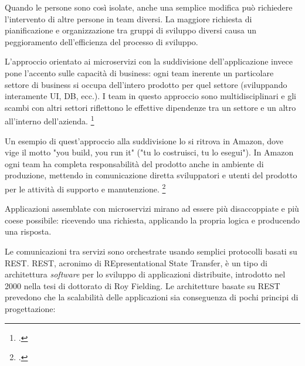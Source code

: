 Quando le persone sono così isolate, anche una semplice modifica può richiedere l'intervento di altre persone in team diversi.
La maggiore richiesta di pianificazione e organizzazione tra gruppi di sviluppo diversi causa un peggioramento dell'efficienza del processo di sviluppo.

L'approccio orientato ai microservizi con la suddivisione dell'applicazione invece pone l'accento sulle capacità di business: ogni team inerente un particolare settore di business si occupa dell'intero prodotto per quel settore (sviluppando interamente UI, DB, ecc.).
I team in questo approccio sono multidisciplinari e gli scambi con altri settori riflettono le effettive dipendenze tra un settore e un altro all'interno dell'azienda.
\footcite{site:fowler-microservices}

Un esempio di quest'approccio alla suddivisione lo si ritrova in Amazon, dove vige il motto "you build, you run it" ("tu lo costruisci, tu lo esegui").
In Amazon ogni team ha completa responsabilità del prodotto anche in ambiente di produzione, mettendo in comunicazione diretta sviluppatori e utenti del prodotto per le attività di supporto e manutenzione.
\footcite{site:amazon-microservices}

Applicazioni assemblate con microservizi mirano ad essere più disaccoppiate e più coese possibile: ricevendo una richiesta, applicando la propria logica e producendo una risposta.

Le comunicazioni tra servizi sono orchestrate usando semplici protocolli basati su REST.
REST, acronimo di REpresentational State Transfer, è un tipo di architettura \emph{software} per lo sviluppo di applicazioni distribuite, introdotto nel 2000 nella tesi di dottorato di Roy Fielding.
Le architetture basate su REST prevedono che la scalabilità delle applicazioni sia conseguenza di pochi principi di progettazione:

